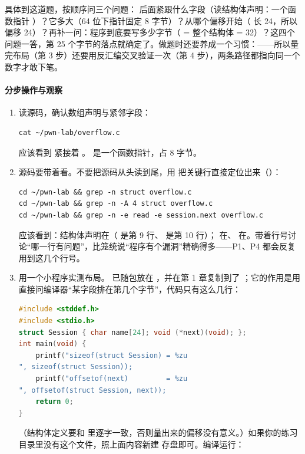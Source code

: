 \documentclass[UTF8,12pt,oneside]{ctexbook}
\begin{document}
具体到这道题，按顺序问三个问题： 后面紧跟什么字段（读结构体声明：一个函数指针 ）？它多大（64 位下指针固定 8 字节）？从哪个偏移开始（ 长 24，所以偏移 24）？再补一问：程序到底要写多少字节（ = 整个结构体 = 32）？这四个问题一答，第 25 个字节的落点就确定了。做题时还要养成一个习惯：——所以量完布局（第 3 步）还要用反汇编交叉验证一次（第 4 步），两条路径都指向同一个数字才敢下笔。

\paragraph{分步操作与观察}
\begin{enumerate}[label=\arabic*.]
\item 读源码，确认数组声明与紧邻字段：
\begin{lstlisting}
cat ~/pwn-lab/overflow.c
\end{lstlisting}
应该看到  紧接着 。 是一个函数指针，占 8 字节。
\item 源码要带着看。不要把源码从头读到尾，用  把关键行直接定位出来（）：
\begin{lstlisting}
cd ~/pwn-lab && grep -n struct overflow.c
cd ~/pwn-lab && grep -n -A 4 struct overflow.c
cd ~/pwn-lab && grep -n -e read -e session.next overflow.c
\end{lstlisting}
应该看到：结构体声明在（ 是第 9 行、 是第 10 行）； 在、 在。带着行号讨论“哪一行有问题”，比笼统说“程序有个漏洞”精确得多——P1、P4 都会反复用到这几个行号。
\item 用一个小程序实测布局。 已随包放在 ，并在第 1 章复制到了 ；它的作用是用  直接问编译器“某字段排在第几个字节”，代码只有这么几行：
\begin{lstlisting}[language=C]
#include <stddef.h>
#include <stdio.h>
struct Session { char name[24]; void (*next)(void); };
int main(void) {
    printf("sizeof(struct Session) = %zu
", sizeof(struct Session));
    printf("offsetof(next)         = %zu
", offsetof(struct Session, next));
    return 0;
}
\end{lstlisting}
（结构体定义要和  里逐字一致，否则量出来的偏移没有意义。）如果你的练习目录里没有这个文件，照上面内容新建  存盘即可。编译运行：
\begin{lstlisting}

\end{lstlisting}
\end{enumerate}
\end{document}
